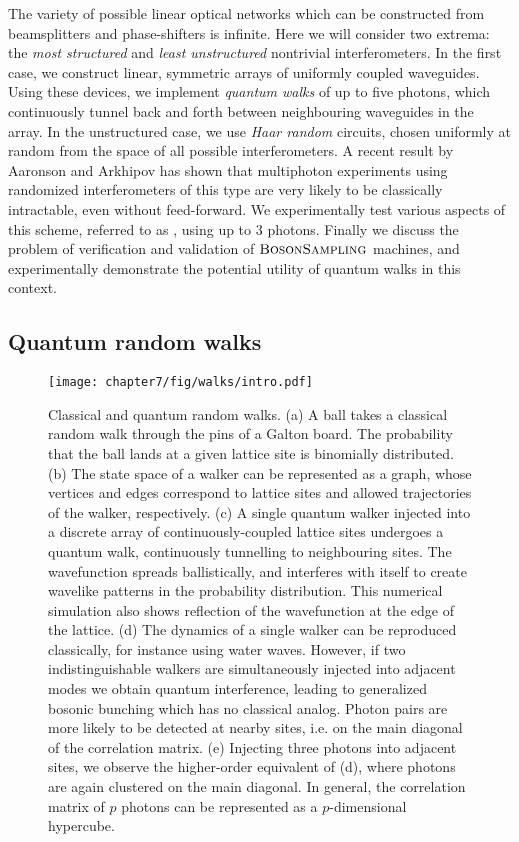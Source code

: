 The variety of possible linear optical networks which can be constructed from beamsplitters and phase-shifters is infinite. Here we will consider two extrema: the \emph{most structured} and \emph{least unstructured} nontrivial interferometers. In the first case, we construct linear, symmetric arrays of uniformly coupled waveguides. Using these devices, we implement \emph{quantum walks} of up to five photons, which continuously tunnel back and forth between neighbouring waveguides in the array. In the unstructured case, we use \emph{Haar random} circuits, chosen uniformly at random from the space of all possible interferometers. A recent result by Aaronson and Arkhipov \cite{Aaronson2010} has shown that multiphoton experiments using randomized interferometers of this type are very likely to be classically intractable, even without feed-forward. We experimentally test various aspects of this scheme, referred to as \bosonsampling, using up to 3 photons. Finally we discuss the problem of verification and validation of $\textsc{BosonSampling}$ machines, and experimentally demonstrate the potential utility of quantum walks in this context.

\subsection{Quantum random walks}
\label{sec:quantum-random-walks}

\begin{figure}[t!]
\centering
\texttt{[image: chapter7/fig/walks/intro.pdf]}
\caption[Classical and quantum random walks]{
    Classical and quantum random walks. (a) A ball takes a classical random walk through the pins of a Galton board. The probability that the ball lands at a given lattice site is binomially distributed. (b) The state space of a walker can be represented as a graph, whose vertices and edges correspond to lattice sites and allowed trajectories of the walker, respectively. (c) A single quantum walker injected into a discrete array of continuously-coupled lattice sites undergoes a quantum walk, continuously tunnelling to neighbouring sites. The wavefunction spreads ballistically, and interferes with itself to create wavelike patterns in the probability distribution. This numerical simulation also shows reflection of the wavefunction at the edge of the lattice. (d) The dynamics of a single walker can be reproduced classically, for instance using water waves. However, if two indistinguishable walkers are simultaneously injected into adjacent modes we obtain quantum interference, leading to generalized bosonic bunching which has no classical analog. Photon pairs are more likely to be detected at nearby sites, i.e. on the main diagonal of the correlation matrix. (e) Injecting three photons into adjacent sites, we observe the higher-order equivalent of (d), where photons are again clustered on the main diagonal. In general, the correlation matrix of $p$ photons can be represented as a $p$-dimensional hypercube. }
\label{fig:walks-intro}
\end{figure}

